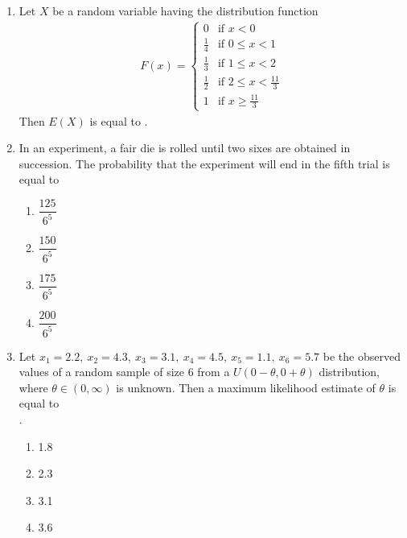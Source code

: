 \documentclass[journal]{IEEEtran}
\numberwithin{equation}{enumi}
\numberwithin{figure}{enumi}
\begin{document}
\begin{enumerate}
\item Let \( X \) be a random variable having the distribution function
\hfill{}
\begin{align*}
F(x) = 
\begin{cases}
0 & \text{if } x < 0 \\[8pt]
\frac{1}{4} & \text{if } 0 \leq x < 1 \\[8pt]
\frac{1}{3} & \text{if } 1 \leq x < 2 \\[8pt]
\frac{1}{2} & \text{if } 2 \leq x < \frac{11}{3} \\[8pt]
1 & \text{if } x \geq \frac{11}{3}
\end{cases}
\end{align*}
Then \( E(X) \) is equal to \underline{\hspace{2cm}}.


\item In an experiment, a fair die is rolled until two sixes are obtained in succession. The probability that the experiment will end in the fifth trial is equal to
\hfill{}
\begin{multicols}{4}
\begin{enumerate}
    \item \( \dfrac{125}{6^5} \)
    \item \( \dfrac{150}{6^5} \)
    \item \( \dfrac{175}{6^5} \)  
    \item \( \dfrac{200}{6^5} \)
\end{enumerate}
\end{multicols}


\item Let \( x_1 = 2.2, \ x_2 = 4.3, \ x_3 = 3.1, \ x_4 = 4.5, \ x_5 = 1.1, \ x_6 = 5.7 \) be the observed values of a random sample of size 6 from a \( U(0-\theta, 0+\theta) \) distribution, where \( \theta \in (0, \infty) \) is unknown. Then a maximum likelihood estimate of \( \theta \) is equal to\\

.  \hfill{}
\begin{multicols}{4}
\begin{enumerate}
    \item 1.8
    \item 2.3
    \item 3.1 
    \item 3.6
\end{enumerate}
\end{multicols}




\end{enumerate}
\end{document}
